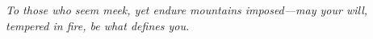 \cleardoublepage
\begingroup
  \hypersetup{pageanchor=false}%
  \thispagestyle{empty}
  \vspace*{\fill}
  \begin{center}\itshape
  To those who seem meek, yet endure mountains imposed—may your will, tempered in fire, be what defines you.
  \end{center}
  \vspace*{\fill}
  \clearpage
\endgroup